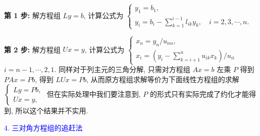 \textbf{第 1 步:} 解方程组 $ L y=b $, 计算公式为 $ \left\{\begin{array}{l}y_{1}=b_{1}, \\ y_{i}=b_{i}-\sum\limits_{k=1}^{i-1} l_{i k} y_{k}, \quad i=2,3, \cdots, n .\end{array}\right. $

\textbf{第 2 步:} 解方程组 $ U x=y $, 计算公式为 $ \left\{\begin{array}{l}x_{n}=y_{n} / u_{n n}, \\ x_{i}=\left(y_{i}-\sum\limits_{k=i+1}^{n} u_{i k} x_{k}\right) / u_{i i}\end{array}\right. $ $ i=n-1, \cdots, 2,1 $. 同样对于列主元的三角分解, 只需对方程组 $ A x=b $ 左乘 $ P $ 得到 $ P A x=P b $, 得到 $ L U x=P b $, 从而原方程组求解等价为下面线性方程组的求解 $ \left\{\begin{array}{l}L y=P b, \\ U x=y,\end{array}\right. $ 但在实际处理中我们要注意到, $ P $ 的形式只有实际完成了约化才能得到, 所以这个结果并不实用.

\textcolor{blue}{4. 三对角方程组的追赶法}

